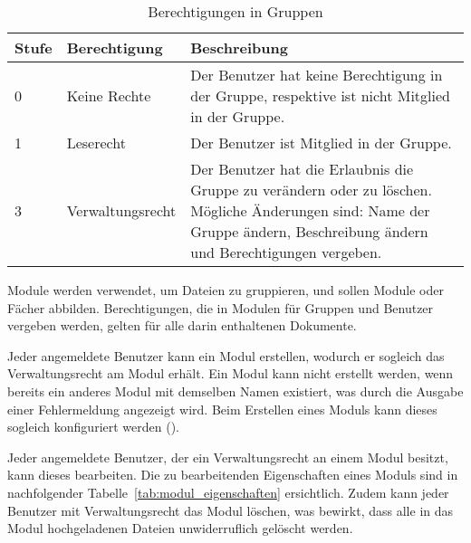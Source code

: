 \begin{table}[H]
\begin{tabularx}{\textwidth}{|l|l|X|} \hline
\textbf{Stufe} & \textbf{Berechtigung}     & \textbf{Beschreibung} \\ \hline
0     & Keine Rechte     & Der Benutzer hat keine Berechtigung in der Gruppe, respektive ist nicht Mitglied in der Gruppe.\\ \hline
1     & Leserecht        & Der Benutzer ist Mitglied in der Gruppe.\\ \hline
3     & Verwaltungsrecht & Der Benutzer hat die Erlaubnis die Gruppe zu verändern oder zu löschen. Mögliche Änderungen sind: Name der Gruppe ändern, Beschreibung ändern und Berechtigungen vergeben.\\ \hline
\end{tabularx}
\caption{Berechtigungen in Gruppen}
\label{tab:gruppe_rechte}
\end{table}

Module werden verwendet, um Dateien zu gruppieren, und sollen Module oder Fächer abbilden. Berechtigungen, die in Modulen für Gruppen und Benutzer vergeben werden, gelten für alle darin enthaltenen Dokumente.

Jeder angemeldete Benutzer kann ein Modul erstellen, wodurch er sogleich das Verwaltungsrecht am Modul erhält. Ein Modul kann nicht erstellt werden, wenn bereits ein anderes Modul mit demselben Namen existiert, was durch die Ausgabe einer Fehlermeldung angezeigt wird.
Beim Erstellen eines Moduls kann dieses sogleich konfiguriert werden ().

Jeder angemeldete Benutzer, der ein Verwaltungsrecht an einem Modul besitzt, kann dieses bearbeiten. Die zu bearbeitenden Eigenschaften eines Moduls sind in nachfolgender Tabelle~\ref{tab:modul_eigenschaften} ersichtlich. Zudem kann jeder Benutzer mit Verwaltungsrecht das Modul löschen, was bewirkt, dass alle in das Modul hochgeladenen Dateien unwiderruflich gelöscht werden.


